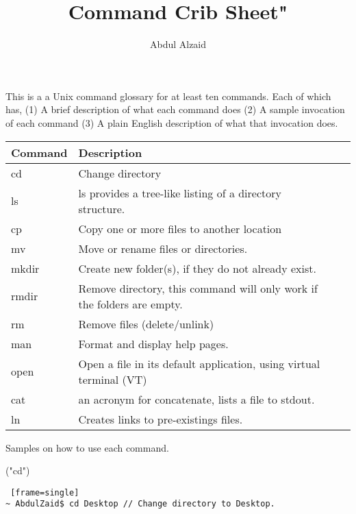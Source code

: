 \documentclass[12pt, oneside]{amsart}   	%
\title{Command Crib Sheet"}
\author{Abdul Alzaid}
\begin{document}
\maketitle
This is a a Unix command glossary for at least ten commands. Each of which has, (1) A brief description of what each command does (2) A sample invocation of each command (3) A plain English description of what that invocation does.


\begin{center}
    \begin{tabular}{| l | l | l | l |}
    \hline
    Command & Description  \\ \hline
    cd & Change directory  \\ \hline
    ls &  ls provides a tree-like listing of a directory structure.  \\ \hline
    cp & Copy one or more files to another location  \\ \hline
    mv & Move or rename files or directories.  \\ \hline
    mkdir & Create new folder(s), if they do not already exist.  \\ \hline
    rmdir & Remove directory, this command will only work if the folders are empty.  \\ \hline
    rm & Remove files (delete/unlink)  \\ \hline
    man & Format and display help pages.  \\ \hline
    open & Open a file in its default application, using virtual terminal (VT)  \\ \hline
    cat &  an acronym for concatenate, lists a file to stdout.  \\ \hline
    ln & Creates links to pre-existings files.  \\ \hline
        \end{tabular}
\end{center}

{\Large Samples on how to use each command.}

("cd")
\begin{lstlisting} [frame=single]
~ AbdulZaid$ cd Desktop // Change directory to Desktop.
 \end{lstlisting} 
 
\end{document}
